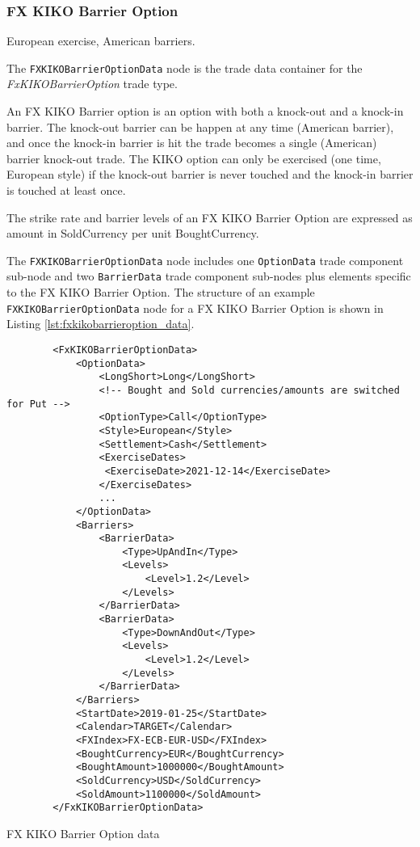 \subsubsection{FX KIKO Barrier Option}

European exercise, American barriers.

The \lstinline!FXKIKOBarrierOptionData! node is the trade data container for the \emph{FxKIKOBarrierOption} trade type.   

An FX KIKO Barrier option is an option with both a knock-out and a knock-in barrier.
The knock-out barrier can be happen at any time (American barrier), and once the knock-in barrier is
hit the trade becomes a single (American) barrier knock-out trade. The KIKO option can only be
exercised (one time, European style)  if the knock-out barrier is never touched and the knock-in barrier is touched
at least once.

The strike rate and barrier levels of an FX KIKO Barrier Option are expressed as amount in SoldCurrency per unit BoughtCurrency. 

The \lstinline!FXKIKOBarrierOptionData!  node includes one  \lstinline!OptionData! trade component sub-node and two \lstinline!BarrierData! trade component sub-nodes plus elements
specific to the FX KIKO Barrier Option. The structure of an example \lstinline!FXKIKOBarrierOptionData! node for a FX KIKO Barrier Option is shown in Listing
\ref{lst:fxkikobarrieroption_data}.

\begin{listing}[H]
\begin{verbatim}
        <FxKIKOBarrierOptionData>
            <OptionData>
                <LongShort>Long</LongShort>
                <!-- Bought and Sold currencies/amounts are switched for Put -->
                <OptionType>Call</OptionType>
                <Style>European</Style>
                <Settlement>Cash</Settlement>
                <ExerciseDates>
                 <ExerciseDate>2021-12-14</ExerciseDate>
                </ExerciseDates>                
                ...
            </OptionData>
            <Barriers>
                <BarrierData>
                    <Type>UpAndIn</Type>
                    <Levels>
                        <Level>1.2</Level>
                    </Levels>
                </BarrierData>
                <BarrierData>
                    <Type>DownAndOut</Type>
                    <Levels>
                        <Level>1.2</Level>
                    </Levels>
                </BarrierData>
            </Barriers>
            <StartDate>2019-01-25</StartDate>
            <Calendar>TARGET</Calendar>
            <FXIndex>FX-ECB-EUR-USD</FXIndex>
            <BoughtCurrency>EUR</BoughtCurrency>
            <BoughtAmount>1000000</BoughtAmount>
            <SoldCurrency>USD</SoldCurrency>
            <SoldAmount>1100000</SoldAmount>
        </FxKIKOBarrierOptionData>
\end{verbatim}
\caption{FX KIKO Barrier Option data}
\label{lst:fxkikobarrieroption_data}
\end{listing}

